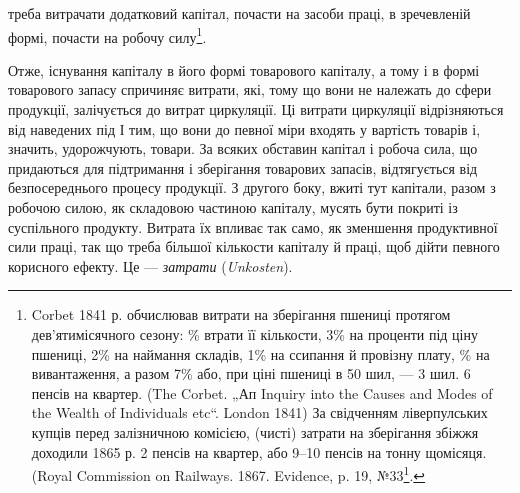 \parcont{}  %
треба витрачати додатковий капітал, почасти на засоби праці, в зречевленій
формі, почасти на робочу силу\footnote{
Corbet 1841 р. обчислював витрати на зберігання пшениці протягом дев'ятимісячного
сезону: \% втрати її кількости, 3\% на проценти під ціну пшениці,
2\% на наймання складів, 1\% на ссипання й провізну плату, \% на вивантаження,
а разом 7\% або, при ціні пшениці в 50 шил, — 3 шил. 6 пенсів на
квартер. (The Corbet. „Ап Inquiry into the Causes and Modes of the Wealth of
Individuals etc“. London 1841) За свідченням ліверпулських купців перед залізничною
комісією, (чисті) затрати на зберігання збіжжя доходили 1865 р. 2 пенсів
на квартер, або 9--10 пенсів на тонну щомісяця. (Royal Commission on Railways.
1867. Evidence, p. 19, №33\footnote*{
Точна назва цього видання така: „Reports from commissioners Session“,
1867, vol. XXXVIII; зазначене місце є в другому відділі першої частини, що має
назву: „Royal Commission on Railways. Minutes of Evidence taken before the commissioners
March 1855 to Mev 1866. Presented to both Houses of Parlament by
command of her Majesty“. London, printed 1867. \emph{Ред.}}.
}.

Отже, існування капіталу в його формі товарового капіталу, а тому
і в формі товарового запасу спричиняє витрати, які, тому що вони не належать
до сфери продукції, залічується до витрат циркуляції. Ці витрати
циркуляції відрізняються від наведених під І тим, що вони до певної
міри входять у вартість товарів і, значить, удорожчують, товари. За всяких
обставин капітал і робоча сила, що придаються для підтримання і
зберігання товарових запасів, відтягується від безпосереднього процесу
продукції. З другого боку, вжиті тут капітали, разом з робочою силою,
як складовою частиною капіталу, мусять бути покриті із суспільного
продукту. Витрата їх впливає так само, як зменшення продуктивної сили
праці, так що треба більшої кількости капіталу й праці, щоб дійти певного
корисного ефекту. Це — \emph{затрати} (\emph{Unkosten}).

